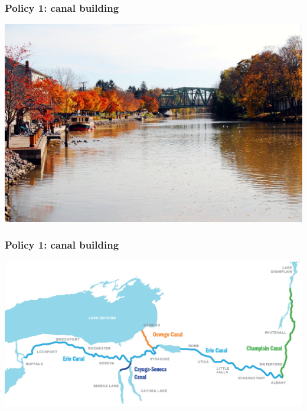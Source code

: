 \documentclass[aspectratio=169]{beamer}
\theoremstyle{principle}
\begin{document}
\begin{frame}
\frametitle{Policy 1: canal building}
    \begin{center}
     \includegraphics[scale=0.1]{erie_canal.jpg}
     \end{center}
\end{frame}

\begin{frame}
\frametitle{Policy 1: canal building}
    \begin{center}
     \includegraphics[scale=0.4]{erie_canal_map.png}
     \end{center}
\end{frame}
\end{document}
